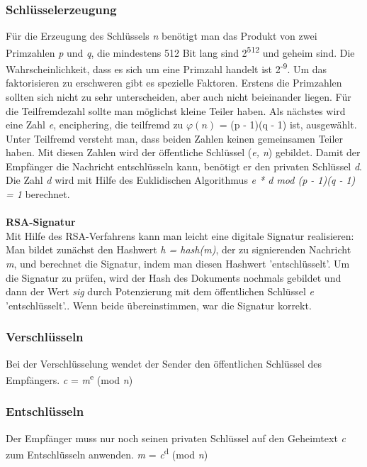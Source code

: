 \documentclass[11pt]{scrartcl}
\begin{document}
\subsubsection{Schlüsselerzeugung}
\label{sec:key-generation}
Für die Erzeugung des Schlüssels \textit{n} benötigt man das Produkt von zwei Primzahlen \textit{p} und \textit{q}, die mindestens 512 Bit lang sind 2\textsuperscript{512} und geheim sind. Die Wahrscheinlichkeit, dass es sich um eine Primzahl handelt ist 2\textsuperscript{-9}. Um das faktorisieren zu erschweren gibt es spezielle Faktoren. Erstens die Primzahlen sollten sich nicht zu sehr unterscheiden, aber auch nicht beieinander liegen. Für die Teilfremdezahl sollte man möglichst kleine Teiler haben. Als nächstes wird eine Zahl \textit{e}, enciphering, die teilfremd zu $\varphi(n)$ = (p - 1)(q - 1) ist, ausgewählt. Unter Teilfremd versteht man, dass beiden Zahlen keinen gemeinsamen Teiler haben. Mit diesen Zahlen wird der öffentliche Schlüssel (\textit{e, n}) gebildet. Damit der Empfänger die Nachricht entschlüsseln kann, benötigt er den privaten Schlüssel \textit{d}. Die Zahl \textit{d} wird mit Hilfe des Euklidischen Algorithmus \textit{e * d mod (p - 1)(q - 1) = 1} berechnet.\\\\
\noindent
\textbf{RSA-Signatur}\\
\grqq{}Mit Hilfe des RSA-Verfahrens kann man leicht eine digitale Signatur realisieren: Man bildet zunächst den Hashwert \textit{h = hash(m)}, der zu signierenden Nachricht \textit{m}, und berechnet die Signatur, indem man diesen Hashwert 'entschlüsselt'.\grqq{}\cite{1}
Um die Signatur zu prüfen, wird der Hash des Dokuments nochmals gebildet und \grqq{} dann der Wert \textit{sig} durch Potenzierung mit dem öffentlichen Schlüssel \textit{e} 'entschlüsselt'.\grqq{}\cite{1}.
Wenn beide übereinstimmen, war die Signatur korrekt. \cite{1}\cite{2}\cite{6}
\subsubsection{Verschlüsseln}
\label{sec:rsa-encrypt}
Bei der Verschlüsselung wendet der Sender den öffentlichen Schlüssel des Empfängers. \textit{c} = \textit{m}\textsuperscript{e} (mod \textit{n}) \cite{6}

\subsubsection{Entschlüsseln}
\label{sec:rsa-decrypt}
Der Empfänger muss nur noch seinen privaten Schlüssel auf den Geheimtext \textit{c} zum Entschlüsseln anwenden. \textit{m} = \textit{c}\textsuperscript{d} (mod \textit{n}) \cite{6}
\end{document}
